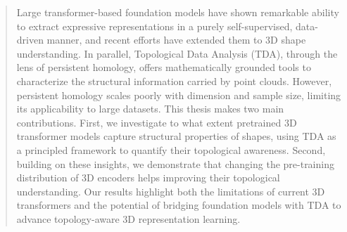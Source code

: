 \begin{abstract}
\label{sec:abstract}
Large transformer-based foundation models have shown remarkable ability to extract expressive representations in a purely self-supervised, data-driven manner, and recent efforts have extended them to 3D shape understanding. In parallel, Topological Data Analysis (TDA), through the lens of persistent homology, offers mathematically grounded tools to characterize the structural information carried by point clouds. However, persistent homology scales poorly with dimension and sample size, limiting its applicability to large datasets. This thesis makes two main contributions. First, we investigate to what extent pretrained 3D transformer models capture structural properties of shapes, using TDA as a principled framework to quantify their topological awareness. Second, building on these insights, we demonstrate that changing the pre-training distribution of 3D encoders helps improving their topological understanding. Our results highlight both the limitations of current 3D transformers and the potential of bridging foundation models with TDA to advance topology-aware 3D representation learning.
\end{abstract}